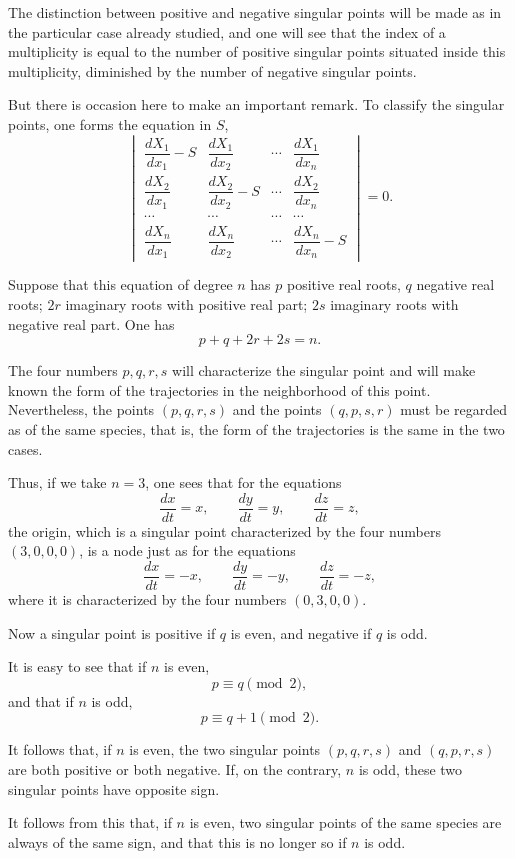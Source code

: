 \documentclass[11pt]{article}
\begin{document}
The distinction between positive and negative singular points will be made as in the particular case already studied, and one will see that the index of a multiplicity is equal to the number of positive singular points situated inside this multiplicity, diminished by the number of negative singular points.

But there is occasion here to make an important remark. To classify the singular points, one forms the equation in $S$,
\[
\begin{vmatrix}
\dfrac{dX_1}{dx_1}-S & \dfrac{dX_1}{dx_2} & \cdots & \dfrac{dX_1}{dx_n}\\
\dfrac{dX_2}{dx_1} & \dfrac{dX_2}{dx_2}-S & \cdots & \dfrac{dX_2}{dx_n}\\
\cdots & \cdots & \cdots & \cdots\\
\dfrac{dX_n}{dx_1} & \dfrac{dX_n}{dx_2} & \cdots & \dfrac{dX_n}{dx_n}-S
\end{vmatrix}=0.
\]

Suppose that this equation of degree $n$ has $p$ positive real roots, $q$ negative real roots; $2r$ imaginary roots with positive real part; $2s$ imaginary roots with negative real part. One has
\[
p+q+2r+2s=n.
\]

The four numbers $p,q,r,s$ will characterize the singular point and will make known the form of the trajectories in the neighborhood of this point. Nevertheless, the points $(p,q,r,s)$ and the points $(q,p,s,r)$ must be regarded as of the same species, that is, the form of the trajectories is the same in the two cases.

Thus, if we take $n=3$, one sees that for the equations
\[
\frac{dx}{dt}=x,
\qquad
\frac{dy}{dt}=y,
\qquad
\frac{dz}{dt}=z,
\]
the origin, which is a singular point characterized by the four numbers $(3,0,0,0)$, is a node just as for the equations
\[
\frac{dx}{dt}=-x,
\qquad
\frac{dy}{dt}=-y,
\qquad
\frac{dz}{dt}=-z,
\]
where it is characterized by the four numbers $(0,3,0,0)$.

Now a singular point is positive if $q$ is even, and negative if $q$ is odd.

It is easy to see that if $n$ is even,
\[
p\equiv q\pmod 2,
\]
and that if $n$ is odd,
\[
p\equiv q+1\pmod 2.
\]

It follows that, if $n$ is even, the two singular points $(p,q,r,s)$ and $(q,p,r,s)$ are both positive or both negative. If, on the contrary, $n$ is odd, these two singular points have opposite sign.

It follows from this that, if $n$ is even, two singular points of the same species are always of the same sign, and that this is no longer so if $n$ is odd.
\end{document}
